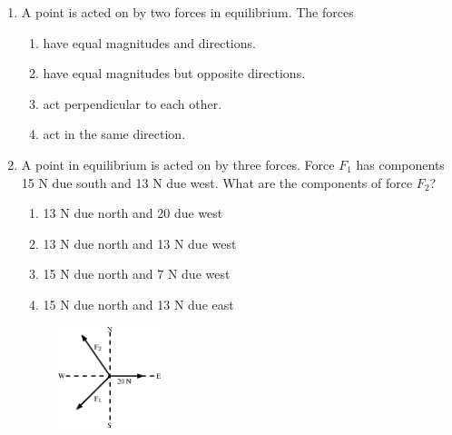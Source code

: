 \begin{enumerate}[noitemsep, label=\textbf{\arabic*}. ]
    \par
          \label{m38819*uid92}\item A point is acted on by two forces in equilibrium. The forces
\label{m38819*id197705}\begin{enumerate}[noitemsep, label=\textbf{\alph*}. ] 
            \label{m38819*uid93}\item have equal magnitudes and directions.
\label{m38819*uid94}\item have equal magnitudes but opposite directions.
\label{m38819*uid95}\item act perpendicular to each other.
\label{m38819*uid96}\item act in the same direction.
\end{enumerate}
                \label{m38819*uid97}\item A point in equilibrium is acted on by three forces. Force \begin{math}{F}_{1}\end{math} has components 15 N due south and 13 N due west. What are the components of force \begin{math}{F}_{2}\end{math}?
\label{m38819*id197809}\begin{enumerate}[noitemsep, label=\textbf{\alph*}. ] 
            \label{m38819*uid98}\item 13 N due north and 20 due west
\label{m38819*uid99}\item 13 N due north and 13 N due west
\label{m38819*uid100}\item 15 N due north and 7 N due west
\label{m38819*uid101}\item 15 N due north and 13 N due east
\end{enumerate}
        
    \setcounter{subfigure}{0}


	\begin{figure}[H] %
    \begin{center}
    \label{m38819*id197871!!!underscore!!!media}\label{m38819*id197871!!!underscore!!!printimage}\includegraphics[width=3cm]{col11305.imgs/m38819_PG11C1_079.png} %
        

\end{center}
\end{figure}
\end{enumerate}
